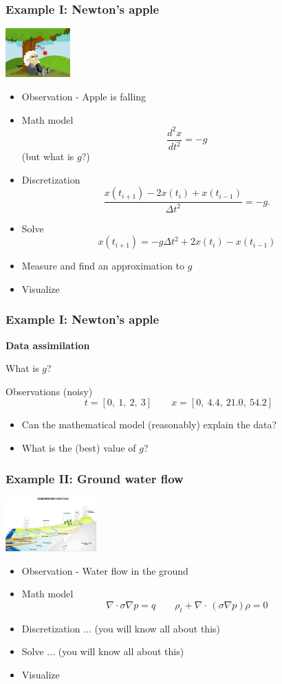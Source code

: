 \documentclass[12pt,fleqn]{beamer}
\renewcommand{\div}{\nabla\cdot\,}
\begin{document}
\begin{frame}
	\frametitle{Example I: Newton's apple}
	
\includegraphics[width=2.5cm]{apple-newton}
\begin{itemize}
\item Observation - Apple is falling
\item Math model 
$${\frac {d^{2}x}{dt^{2}}} = -g$$ (but what is $g$?)
\item Discretization
$$ {\frac {x(t_{i+1}) - 2 x(t_{i}) + x(t_{i-1})}{\Delta t^{2}}} = -g. $$
\item Solve
$$	x(t_{i+1}) = -g \Delta t^{2} + 2 x(t_{i}) - x(t_{i-1}) $$
\item Measure and find an approximation to $g$
\item Visualize
\end{itemize}
	
	
\end{frame}


\begin{frame}
\frametitle{Example I:  Newton's apple}

{\bf Data assimilation}

What is $g$?

\vspace{12pt}

Observations (noisy)
$$ t = [0,\ 1,\ 2,\ 3] \quad \quad x = [0,\ 4.4,\  21.0,\ 54.2] $$

\begin{itemize}
\item Can the mathematical model (reasonably) explain the data?
\item What is the (best) value of $g$?
\end{itemize}


\end{frame}


\begin{frame}
\frametitle{Example II: Ground water flow}

\includegraphics[width=3.5cm]{GroundwaterFlowCycle}
\begin{itemize}
\item Observation - Water flow in the ground
\item Math model 
$$\nabla \cdot \sigma \nabla p = q\quad \quad \rho_{t} + \div (\sigma \nabla p ) \rho = 0$$
\item Discretization ... (you will know all about this)
\item Solve ... (you will know all about this)
\item Visualize
\end{itemize}

\end{frame}
\end{document}
